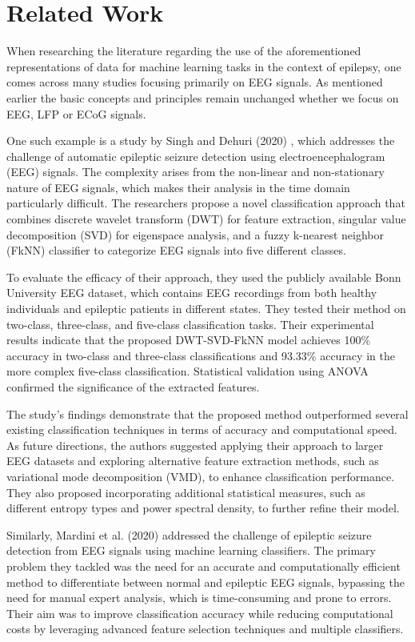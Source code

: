 \documentclass{article}
\begin{document}
\section{Related Work}
When researching the literature regarding the use of the aforementioned representations of data for machine learning tasks in the context of epilepsy, one comes across many studies focusing primarily on EEG signals. As mentioned earlier the basic concepts and principles remain unchanged whether we focus on EEG, LFP or ECoG signals.

One such example is a study by Singh and Dehuri (2020) \cite{singh2020}, which addresses the challenge of automatic epileptic seizure detection using electroencephalogram (EEG) signals. The complexity arises from the non-linear and non-stationary nature of EEG signals, which makes their analysis in the time domain particularly difficult. The researchers propose a novel classification approach that combines discrete wavelet transform (DWT) for feature extraction, singular value decomposition (SVD) for eigenspace analysis, and a fuzzy k-nearest neighbor (FkNN) classifier to categorize EEG signals into five different classes.

To evaluate the efficacy of their approach, they used the publicly available Bonn University EEG dataset, which contains EEG recordings from both healthy individuals and epileptic patients in different states. They tested their method on two-class, three-class, and five-class classification tasks. Their experimental results indicate that the proposed DWT-SVD-FkNN model achieves 100\% accuracy in two-class and three-class classifications and 93.33\% accuracy in the more complex five-class classification. Statistical validation using ANOVA confirmed the significance of the extracted features.

The study's findings demonstrate that the proposed method outperformed several existing classification techniques in terms of accuracy and computational speed. As future directions, the authors suggested applying their approach to larger EEG datasets and exploring alternative feature extraction methods, such as variational mode decomposition (VMD), to enhance classification performance. They also proposed incorporating additional statistical measures, such as different entropy types and power spectral density, to further refine their model.

Similarly, Mardini et al. (2020) \cite{mardini2020} addressed the challenge of epileptic seizure detection from EEG signals using machine learning classifiers. The primary problem they tackled was the need for an accurate and computationally efficient method to differentiate between normal and epileptic EEG signals, bypassing the need for manual expert analysis, which is time-consuming and prone to errors. Their aim was to improve classification accuracy while reducing computational costs by leveraging advanced feature selection techniques and multiple classifiers.
\end{document}
